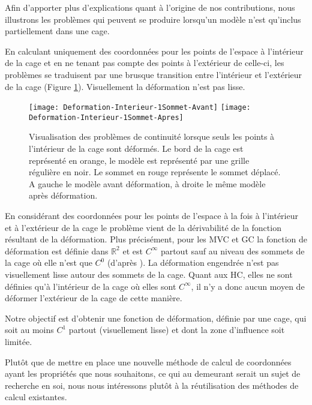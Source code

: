 Afin d'apporter plus d'explications quant à l'origine de nos contributions,
nous illustrons les problèmes qui peuvent se produire lorsqu'un modèle n'est
qu'inclus partiellement dans une cage.

En calculant uniquement des coordonnées pour les points de l'espace à
l'intérieur de la cage et en ne tenant pas compte des points à l'extérieur de
celle-ci, les problèmes se traduisent par une brusque transition entre
l'intérieur et l'extérieur de la cage (Figure \ref{MELVI}). Visuellement la
déformation n'est pas lisse.

\begin{figure}[ht]
  \begin{center}
    \scalebox{0.2}
    {
      \texttt{[image: Deformation-Interieur-1Sommet-Avant]}
      \texttt{[image: Deformation-Interieur-1Sommet-Apres]}
    }

    \caption[Problème de continuité déformation naïve] {Visualisation des
problèmes de continuité lorsque seuls les points à l'intérieur de la cage sont
déformés. Le bord de la cage est représenté en orange, le modèle est
représenté par une grille régulière en noir. Le sommet en rouge représente le
sommet déplacé. A gauche le modèle avant déformation, à droite le même modèle
après déformation.}

    \label{MELVI}
  \end{center}
\end{figure}

En considérant des coordonnées pour les points de l'espace à la fois à
l'intérieur et à l'extérieur de la cage le problème vient de la dérivabilité
de la fonction résultant de la déformation. Plus précisément, pour les MVC et
GC la fonction de déformation est définie dans $\mathbb{R}^2$ et est
$C^{\infty}$ partout sauf au niveau des sommets de la cage où elle n'est que
$C^0$ (d'après \cite{LS08}). La déformation engendrée n'est pas visuellement lisse autour des
sommets de la cage. Quant aux HC, elles ne sont définies qu'à l'intérieur de
la cage où elles sont $C^{\infty}$, il n'y a donc aucun moyen de déformer
l'extérieur de la cage de cette manière.

Notre objectif est d'obtenir une fonction de déformation, définie par une
cage, qui soit au moins $C^1$ partout (visuellement lisse) et dont la zone
d'influence soit limitée.

Plutôt que de mettre en place une nouvelle méthode de calcul de coordonnées
ayant les propriétés que nous souhaitons, ce qui au demeurant serait un sujet
de recherche en soi, nous nous intéressons plutôt à la réutilisation des
méthodes de calcul existantes.

